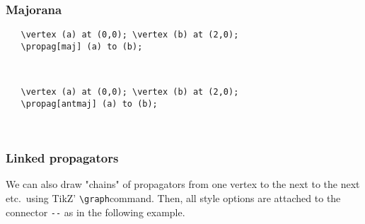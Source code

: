\documentclass[10pt,letterpaper,twoside,notitlepage]{article}
\numberwithin{figure}{section}
\begin{document}
\subsubsection*{Majorana}
%
\begin{minipage}{0.7\linewidth}
\vercol\begin{verbatim}
   \vertex (a) at (0,0); \vertex (b) at (2,0);
   \propag[maj] (a) to (b);
\end{verbatim}\txcol
\end{minipage}
%
\begin{minipage}{0.25\linewidth}
\end{minipage}
\\
%
\begin{minipage}{0.7\linewidth}
\vercol\begin{verbatim}
   \vertex (a) at (0,0); \vertex (b) at (2,0);
   \propag[antmaj] (a) to (b);
\end{verbatim}\txcol
\end{minipage}
%
\begin{minipage}{0.25\linewidth}
\end{minipage}
\\
%
\subsubsection*{Linked propagators}
%
\noindent
We can also draw "chains" of propagators from one vertex to the next to the next etc.~using
TikZ' \blucol\verb$\graph$\txcol command. 
Then, all style options are attached to the connector \blucol\verb$--$\txcol 
as in the following example. 
\\
\end{document}
